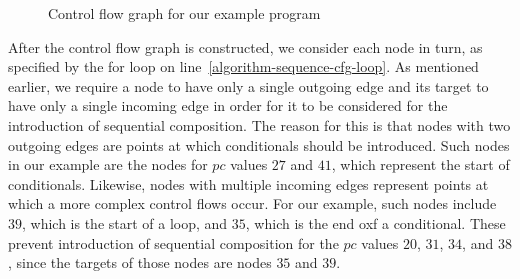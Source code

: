 \begin{figure}
  \begin{center}
    \footnotesize
  \end{center}
  \caption{Control flow graph for our example program}
  \label{example-control-flow-graph-figure}
\end{figure}

After the control flow graph is constructed, we consider each node in
turn, as specified by the for loop on
line~\ref{algorithm-sequence-cfg-loop}.
As mentioned earlier, we require a node to have only a single outgoing
edge and its target to have only a single incoming edge in order for
it to be considered for the introduction of sequential composition.
The reason for this is that nodes with two outgoing edges are points
at which conditionals should be introduced.
Such nodes in our example are the nodes for $pc$ values $27$ and $41$,
which represent the start of conditionals.
Likewise, nodes with multiple incoming edges represent points at which
a more complex control flows occur.
For our example, such nodes include $39$, which is the start of a
loop, and $35$, which is the end oxf a conditional.
These prevent introduction of sequential composition for the $pc$
values $20$, $31$, $34$, and $38$, since the targets of those nodes
are nodes $35$ and $39$.

